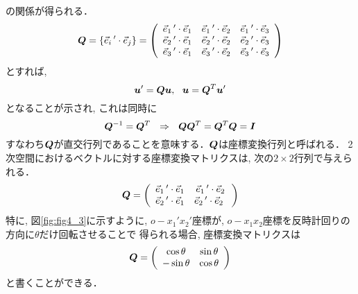 \documentclass[10pt,a4j]{jarticle}
\begin{document}
の関係が得られる．
\begin{equation}
	\mbox{\boldmath $Q$}=
	\left\{
		\vec{e}_i\,'\cdot \vec{e}_j
	\right\}
	=
	\left( 
	\begin{array}{ccc}
		\vec{e}_1\,'\cdot \vec{e}_1 & \vec{e}_1\,'\cdot \vec{e}_2 & \vec{e}_1\,'\cdot \vec{e}_3 \\
		\vec{e}_2\,'\cdot \vec{e}_1 & \vec{e}_2\,'\cdot \vec{e}_2 & \vec{e}_2\,'\cdot \vec{e}_3 \\
		\vec{e}_3\,'\cdot \vec{e}_1 & \vec{e}_3\,'\cdot \vec{e}_2 & \vec{e}_3\,'\cdot \vec{e}_3 
	\end{array}
	\right)
\end{equation}
とすれば, 
\begin{equation}
	\fat{u}'=\fat{Q}\fat{u}, \ \ 
	\fat{u}=\fat{Q}^T\fat{u}'
\end{equation}
となることが示され, これは同時に
\begin{equation}
	\fat{Q}^{-1}=\fat{Q}^{T} \ \ \Rightarrow \ \ \fat{QQ}^T=\fat{Q}^T\fat{Q}=\fat{I}
\end{equation}
すなわち$\mbox{\boldmath $Q$}$が直交行列であることを意味する．$\mbox{\boldmath $Q$}$は座標変換行列と呼ばれる．
2次空間におけるベクトルに対する座標変換マトリクスは, 次の$2\times 2$行列で与えられる．
\begin{equation}
	\mbox{\boldmath $Q$}=
	\left( 
	\begin{array}{cc}
		\vec{e}_1\,'\cdot \vec{e}_1 & \vec{e}_1\,'\cdot \vec{e}_2 \\
		\vec{e}_2\,'\cdot \vec{e}_1 & \vec{e}_2\,'\cdot \vec{e}_2 \
	\end{array}
	\right)
\end{equation}
特に, 図\ref{fig:fig4_3}に示すように, $o-x_1'x_2'$座標が, $o-x_1x_2$座標を反時計回りの方向に$\theta$だけ回転させることで
得られる場合, 座標変換マトリクスは
\begin{equation}
	\mbox{\boldmath $Q$}=
	\left( 
	\begin{array}{cc}
		 \cos \theta & \sin \theta \\
		-\sin \theta & \cos \theta 
	\end{array}
	\right)
	\label{eqn:Qth}
\end{equation}
と書くことができる．
\end{document}
